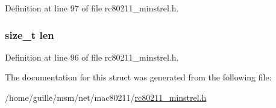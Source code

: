 Definition at line 97 of file rc80211\-\_\-minstrel.\-h.

\hypertarget{structminstrel__debugfs__info_a7360b55975153b822efc5217b7734e6a}{
\subsubsection[{len}]{\setlength{\rightskip}{0pt plus 5cm}size\-\_\-t len}}\label{structminstrel__debugfs__info_a7360b55975153b822efc5217b7734e6a}


Definition at line 96 of file rc80211\-\_\-minstrel.\-h.



The documentation for this struct was generated from the following file\-:\begin{DoxyCompactItemize}
\item 
/home/guille/msm/net/mac80211/\hyperlink{rc80211__minstrel_8h}{rc80211\-\_\-minstrel.\-h}\end{DoxyCompactItemize}
